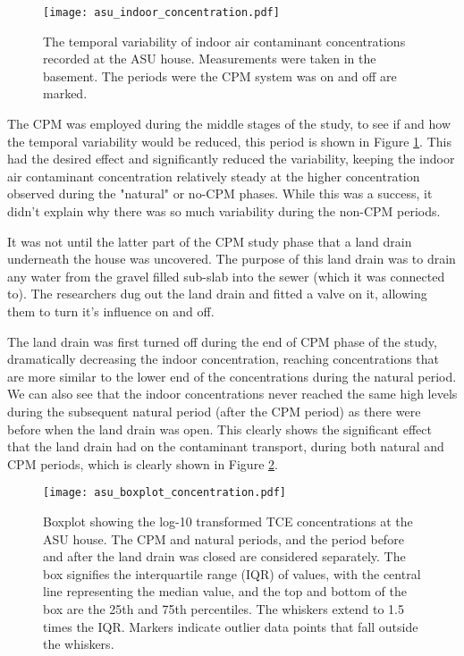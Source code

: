 \begin{figure}[htb!]
  \texttt{[image: asu\_indoor\_concentration.pdf]}
  \caption{The temporal variability of indoor air contaminant concentrations recorded at the ASU house. Measurements were taken in the basement. The periods were the CPM system was on and off are marked.}
  \label{fig:asu_indoor_concentration}
\end{figure}

The CPM was employed during the middle stages of the study, to see if and how the temporal variability would be reduced, this period is shown in Figure \ref{fig:asu_indoor_concentration}.
This had the desired effect and significantly reduced the variability, keeping the indoor air contaminant concentration relatively steady at the higher concentration observed during the "natural" or no-CPM phases.
While this was a success, it didn't explain why there was so much variability during the non-CPM periods.\par

It was not until the latter part of the CPM study phase that a land drain underneath the house was uncovered.
The purpose of this land drain was to drain any water from the gravel filled sub-slab into the sewer (which it was connected to).
The researchers dug out the land drain and fitted a valve on it, allowing them to turn it's influence on and off.\par

The land drain was first turned off during the end of CPM phase of the study, dramatically decreasing the indoor concentration, reaching concentrations that are more similar to the lower end of the concentrations during the natural period.
We can also see that the indoor concentrations never reached the same high levels during the subsequent natural period (after the CPM period) as there were before when the land drain was open.
This clearly shows the significant effect that the land drain had on the contaminant transport, during both natural and CPM periods, which is clearly shown in Figure \ref{fig:asu_concentration_boxplot}.\par

\begin{figure}[htb!]
  \texttt{[image: asu\_boxplot\_concentration.pdf]}
  \caption{Boxplot showing the log-10 transformed TCE concentrations at the ASU house. The CPM and natural periods, and the period before and after the land drain was closed are considered separately. The box signifies the interquartile range (IQR) of values, with the central line representing the median value, and the top and bottom of the box are the 25th and 75th percentiles. The whiskers extend to 1.5 times the IQR. Markers indicate outlier data points that fall outside the whiskers.}
  \label{fig:asu_concentration_boxplot}
\end{figure}

